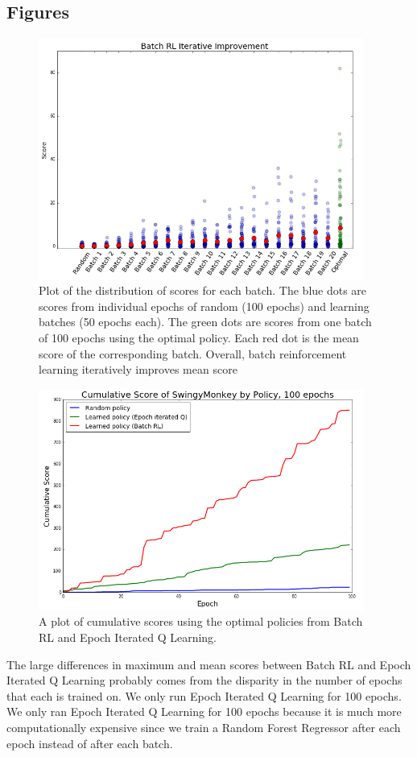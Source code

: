 \documentclass[11pt, oneside]{article}   	%
\begin{document}
  \subsection{Figures}
  \begin{figure}[ht!]
  \centering
  \includegraphics[width=0.95\textwidth]{batch_iterative_improvement}
  \caption{Plot of the distribution of scores for each batch.  The blue dots are scores from individual epochs of random (100 epochs) and learning batches (50 epochs each).  The green dots are scores from one batch of 100 epochs using the optimal policy.  Each red dot is the mean score of the corresponding batch.  Overall, batch reinforcement learning iteratively improves mean score}
   \end{figure}
  \begin{figure}[ht!]
  \centering
  \includegraphics[width=0.95\textwidth]{cumulative_score}
  \caption{A plot of cumulative scores using the optimal policies from Batch RL and Epoch Iterated Q Learning.}
 \end{figure}  
 The large differences in maximum and mean scores between Batch RL and Epoch Iterated Q Learning probably comes from the disparity in the number of epochs that each is trained on.  We only run Epoch Iterated Q Learning for 100 epochs. We only ran Epoch Iterated Q Learning for 100 epochs because it is much more computationally expensive since we train a Random Forest Regressor after each epoch instead of after each batch.  
\end{document}
